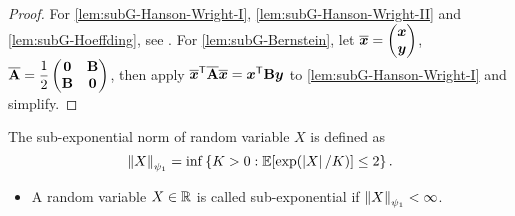 \begin{proof}
    For \ref{lem:subG-Hanson-Wright-I}, \ref{lem:subG-Hanson-Wright-II} and \ref{lem:subG-Hoeffding}, see \cite[Theorem 6.2.1, Theorem 6.3.2, Theorem 2.6.3]{vershynin2018high}. For \ref{lem:subG-Bernstein},
    let $\overline{\text{\boldmath $x$}} = \begin{pmatrix}
        \text{\boldmath $x$} \\ \text{\boldmath $y$}
    \end{pmatrix}$, $\overline{\mathrm{\bf A}} = \dfrac12\begin{pmatrix}
        \mathrm{\bf 0} & \mathrm{\bf B} \\
        \mathrm{\bf B} & \mathrm{\bf 0}
    \end{pmatrix}$, then apply $\overline{\text{\boldmath $x$}}^{\sf T} \overline{\mathrm{\bf A}} \overline{\text{\boldmath $x$}} = \text{\boldmath $x$}^{\sf T} \mathrm{\bf B} \text{\boldmath $y$}$ to \ref{lem:subG-Hanson-Wright-I} and simplify.
\end{proof}

\begin{defn}
    The sub-exponential norm of random variable $X$ is defined as
    \begin{equation*}
        \left\|{X}\right\|_{\psi_1} = \inf\left\{ K > 0: \mathbb{E}[\exp(\left|{X}\right|/K)] \le 2 \right\}.
    \end{equation*}
    \begin{itemize}
        \item A random variable $X \in \mathbb{R}$ is called sub-exponential if $\left\|{X}\right\|_{\psi_1} < \infty$.
    \end{itemize}   
\end{defn}

